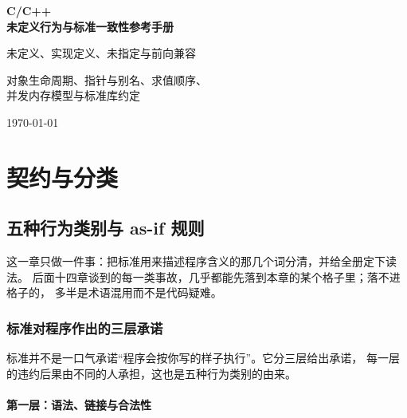 \documentclass[12pt,a4paper,fontset=fandol]{ctexbook}
\begin{document}
\frontmatter

\begin{titlepage}
\centering
\vspace*{4cm}
{\Huge\bfseries C/C++ \\ 未定义行为与标准一致性参考手册\par}
\vspace{1cm}
{\LARGE 未定义、实现定义、未指定与前向兼容\par}
\vspace{0.4cm}
{\Large 对象生命周期、指针与别名、求值顺序、\\ 并发内存模型与标准库约定\par}
\vfill
{\large \today\par}
\end{titlepage}

\tableofcontents

\mainmatter

\cleardoublepage

\part{契约与分类}
\chapter{五种行为类别与 as-if 规则}\label{ch:ub01-taxonomy}

这一章只做一件事：把标准用来描述程序含义的那几个词分清，并给全册定下读法。
后面十四章谈到的每一类事故，几乎都能先落到本章的某个格子里；落不进格子的，
多半是术语混用而不是代码疑难。

\section{标准对程序作出的三层承诺}\label{sec:ub01-three-layers}

标准并不是一口气承诺“程序会按你写的样子执行”。它分三层给出承诺，
每一层的违约后果由不同的人承担，这也是五种行为类别的由来。

\subsection{第一层：语法、链接与合法性}\label{sec:ub01-layer-grammar}
\end{document}
